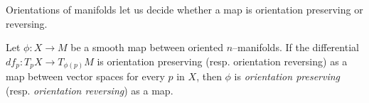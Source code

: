 Orientations of manifolds let us decide whether a map is orientation preserving or reversing.

\begin{defn}
	Let $\phi:X\to M$ be a smooth map between oriented $n$--manifolds.
	If the differential $df_p:T_p X\to T_{\phi(p)} M$ is orientation preserving (resp. orientation reversing) as a map between vector spaces for every $p$ in $X$, then $\phi$ is \emph{orientation preserving} (resp. \emph{orientation reversing}) as a map.
\end{defn}